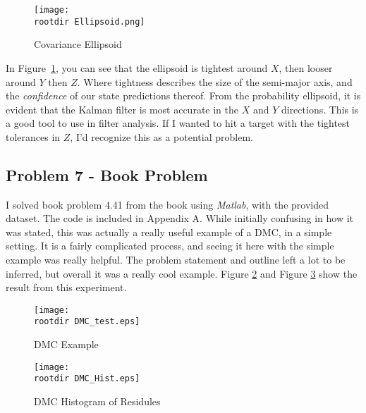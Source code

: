 \documentclass[]{article}
\newcommand{\rootdir}{./Figures/}
\begin{document}
\begin{center}
	\begin{figure}[H]
		\texttt{[image: \\rootdir Ellipsoid.png]}
		\caption{Covariance Ellipsoid}
		\label{fig:ellipsoid}
	\end{figure}
\end{center}


In Figure~\ref{fig:ellipsoid}, you can see that the ellipsoid is tightest around $X$, then looser around $Y$ then $Z$. Where tightness describes the size of the semi-major axis, and the \emph{confidence} of our state predictions thereof. From the probability ellipsoid, it is evident that the Kalman filter is most accurate in the $X$ and $Y$ directions. This is a good tool to use in filter analysis. If I wanted to hit a target with the tightest tolerances in $Z$, I'd recognize this as a potential problem. 


\newpage
\subsection{Problem 7 - Book Problem }

I solved book problem 4.41 from the book using \emph{Matlab}, with the provided dataset. The code is included in Appendix A. While initially confusing in how it was stated, this was actually a really useful example of a DMC, in a simple setting. It is a fairly complicated process, and seeing it here with the simple example was really helpful. The problem statement and outline left a lot to be inferred, but overall it was a really cool example. Figure \ref{fig:DMC} and Figure \ref{fig:DMC_Hist} show the result from this experiment. 


\begin{center}
	\begin{figure}[H]
		\texttt{[image: \\rootdir DMC\_test.eps]}
		\caption{DMC Example}
		\label{fig:DMC}
	\end{figure}
\end{center}

\begin{center}
	\begin{figure}[H]
		\texttt{[image: \\rootdir DMC\_Hist.eps]}
		\caption{DMC Histogram of Residules}
		\label{fig:DMC_Hist}
	\end{figure}
\end{center}
\end{document}
